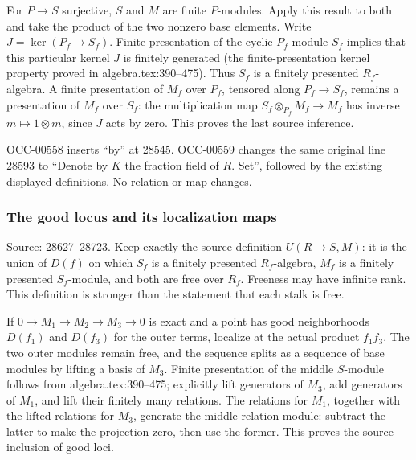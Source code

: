 For \(P\to S\) surjective, \(S\) and \(M\) are finite \(P\)-modules. Apply this result to both and take the product of the two nonzero base elements. Write \(J=\ker(P_f\to S_f)\). Finite presentation of the cyclic \(P_f\)-module \(S_f\) implies that this particular kernel \(J\) is finitely generated (the finite-presentation kernel property proved in algebra.\AlgebraIdentifierBreak{}tex:\AlgebraIdentifierBreak{}390--\AlgebraIdentifierBreak{}475). Thus \(S_f\) is a finitely presented \(R_f\)-algebra. A finite presentation of \(M_f\) over \(P_f\), tensored along \(P_f\to S_f\), remains a presentation of \(M_f\) over \(S_f\): the multiplication map \(S_f\otimes_{P_f}M_f\to M_f\) has inverse \(m\mapsto1\otimes m\), since \(J\) acts by zero. This proves the last source inference.

OCC-00558 inserts ``by'' at 28545. OCC-00559 changes the same original line 28593 to ``Denote by \(K\) the fraction field of \(R\). Set'', followed by the existing displayed definitions. No relation or map changes.

\subsubsection{The good locus and its localization maps}\label{algebra-proof-027-the-good-locus-and-its-localization-maps}

Source: 28627--28723. Keep exactly the source definition \(U(R\to S,M)\): it is the union of \(D(f)\) on which \(S_f\) is a finitely presented \(R_f\)-algebra, \(M_f\) is a finitely presented \(S_f\)-module, and both are free over \(R_f\). Freeness may have infinite rank. This definition is stronger than the statement that each stalk is free.

If \(0\to M_1\to M_2\to M_3\to0\) is exact and a point has good neighborhoods \(D(f_1)\) and \(D(f_3)\) for the outer terms, localize at the actual product \(f_1f_3\). The two outer modules remain free, and the sequence splits as a sequence of base modules by lifting a basis of \(M_3\). Finite presentation of the middle \(S\)-module follows from algebra.\AlgebraIdentifierBreak{}tex:\AlgebraIdentifierBreak{}390--\AlgebraIdentifierBreak{}475; explicitly lift generators of \(M_3\), add generators of \(M_1\), and lift their finitely many relations. The relations for \(M_1\), together with the lifted relations for \(M_3\), generate the middle relation module: subtract the latter to make the projection zero, then use the former. This proves the source inclusion of good loci.

